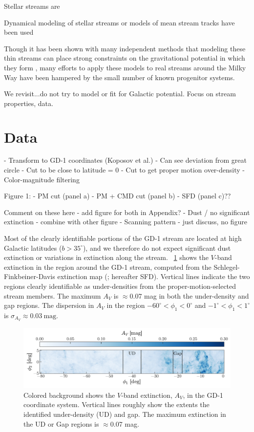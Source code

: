 \documentclass[modern]{aastex62}
\begin{document}
Stellar streams are

\citealt{Bonaca:2018}

Dynamical modeling of stellar streams or models of mean stream tracks have been used


Though it has been shown with many independent methods that modeling these thin streams can place strong constraints on the gravitational potential in which they form \citep{apw14,TODO}, many efforts to apply these models to real streams around the Milky Way have been hampered by the small number of known progenitor systems.


We revisit...do not try to model or fit for Galactic potential. Focus on stream properties, data.

\section{Data}
\label{sec:data}

- Transform to GD-1 coordinates (Koposov et al.)
    - Can see deviation from great circle
- Cut to be close to latitude = 0
- Cut to get proper motion over-density
- Color-magnitude filtering

Figure 1:
- PM cut (panel a)
- PM + CMD cut (panel b)
- SFD (panel c)??

Comment on these here - add figure for both in Appendix?
- Dust / no significant extinction - combine with other figure
- Scanning pattern - just discuss, no figure

Most of the clearly identifiable portions of the GD-1 stream are located at high
Galactic latitudes ($b > 35^\circ$), and we therefore do not expect significant
dust extinction or variations in extinction along the stream.
\figurename~\ref{fig:sfd} shows the $V$-band extinction in the region around the
GD-1 stream, computed from the Schlegel-Finkbeiner-Davis extinction map
(\cite{Schlegel:1998}; hereafter SFD).
Vertical lines indicate the two regions clearly identifiable as under-densities
from the proper-motion-selected stream members.
The maximum $A_V$ is $\approx$0.07 mag in both the under-density and gap
regions.
The dispersion in $A_V$ in the region $-60^\circ < \phi_1 < 0^\circ$ and
$-1^\circ < \phi_1 < 1^\circ$ is $\sigma_{A_V} \approx 0.03~\textrm{mag}$.

\begin{figure}[h]
\begin{center}
\includegraphics[width=\textwidth]{sfd.pdf}
\end{center}
\caption{%
Colored background shows the $V$-band extinction, $A_V$, in the GD-1
coordinate system.
Vertical lines roughly show the extents the identified under-density (UD) and
gap.
The maximum extinction in the UD or Gap regions is $\approx$0.07 mag.
\label{fig:sfd}
}
\end{figure}
\end{document}
